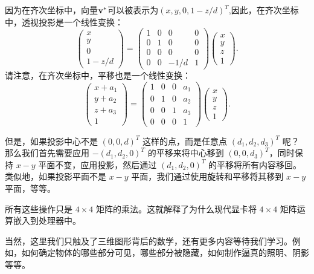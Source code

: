 因为在齐次坐标中，向量$\mathbf{v}^*$可以被表示为$(x, y, 0, 1-z/d)^T$,因此，在齐次坐标中，透视投影是一个线性变换：
$$
\begin{pmatrix} x \\ y \\ 0 \\ 1 - z/d \end{pmatrix} = \begin{pmatrix} 1 & 0 & 0 & 0 \\ 0 & 1 & 0 & 0 \\ 0 & 0 & 0 & 0 \\ 0 & 0 & -1/d & 1 \end{pmatrix} \begin{pmatrix} x \\ y \\ z \\ 1 \end{pmatrix}.
$$
请注意，在齐次坐标中，平移也是一个线性变换：
$$
\begin{pmatrix} x + a_1 \\ y + a_2 \\ z + a_3 \\ 1 \end{pmatrix} = \begin{pmatrix} 1 & 0 & 0 & a_1 \\ 0 & 1 & 0 & a_2 \\ 0 & 0 & 1 & a_3 \\ 0 & 0 & 0 & 1 \end{pmatrix} \begin{pmatrix} x \\ y \\ z \\ 1 \end{pmatrix}.
$$

但是，如果投影中心不是 $(0, 0, d)^T$ 这样的点，而是任意点 $(d_1, d_2, d_3)^T$ 呢？
那么我们首先需要应用 $-( d_1 , d_2 , 0 )^T$ 的平移来将中心移到 $(0, 0, d_3)^T$，同时保持 $x-y$ 平面不变，应用投影，然后通过 $(d_1, d_2, 0)^T$ 的平移将所有内容移回。类似地，如果投影平面不是 $x-y$ 平面，我们通过使用旋转和平移将其移到 $x-y$ 平面，等等。

所有这些操作只是 $4 \times 4$ 矩阵的乘法。这就解释了为什么现代显卡将 $4 \times 4$ 矩阵运算嵌入到处理器中。

当然，这里我们只触及了三维图形背后的数学，还有更多内容等待我们学习。例如，如何确定物体的哪些部分可见，哪些部分被隐藏，如何制作逼真的照明、阴影等等。


